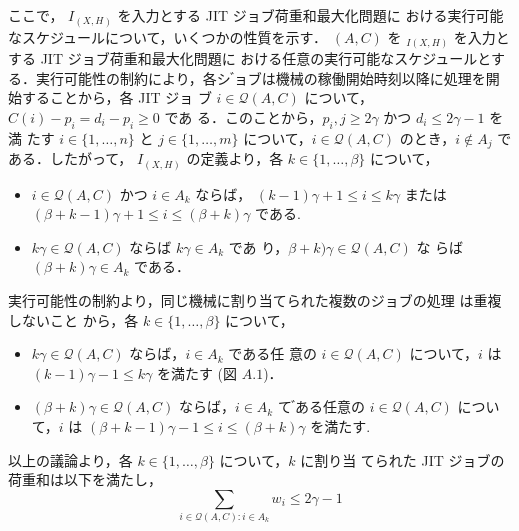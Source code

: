 \documentclass[12pt]{optlab-bachelor}
\begin{document}
ここで， $I_{(X,H)}$ を入力とする JIT ジョブ荷重和最大化問題に
おける実行可能なスケジュールについて，いくつかの性質を示す．
$(A, C)$ を $_{I(X,H)}$ を入力とする JIT ジョブ荷重和最大化問題に
おける任意の実行可能なスケジュールとする．実行可能性の制約により，各シ
゙ョブは機械の稼働開始時刻以降に処理を開始することから，各 JIT ジョ
ブ $i \in \mathcal{Q}(A,C)$ について，$C(i) − p_i = d_i − p_i \ge 0$ であ
る．このことから，$p_i,j \ge 2\gamma$ かつ $d_i \le 2\gamma − 1$ を満
たす $i \in \{1,\ldots,n\}$ と $j \in \{1,\ldots,m\}$ について，$i \in
\mathcal{Q}(A,C)$ のとき，$i \notin A_j$ である．したがって，
$I_{(X,H)}$ の定義より，各 $k \in \{1,\ldots,\beta\}$ について，
\begin{itemize}
\item $i \in \mathcal{Q}(A,C)$ かつ $i \in A_k$ ならば，
  $(k − 1)\gamma + 1 \le i \le k\gamma$ または $(\beta + k − 1)\gamma +
  1 \le i \le (\beta + k)\gamma$ である.
\item $k\gamma \in \mathcal{Q}(A,C)$ ならば $k\gamma \in A_k$ であ
  り，$\beta + k)\gamma \in \mathcal{Q}(A,C)$ な
  らば $(\beta + k)\gamma \in A_k$ である．
\end{itemize}
実行可能性の制約より，同じ機械に割り当てられた複数のジョブの処理
は重複しないこと から，各 $k \in \{1,\ldots,\beta\}$ について，
\begin{itemize}
\item $k\gamma \in \mathcal{Q}(A,C)$ ならば，$i \in A_k$ である任
  意の $i \in \mathcal{Q}(A,C)$ について，$i$ は $(k − 1)\gamma− 1
  \le k\gamma$ を満たす (図 $A.1$)．
\item $(\beta + k)\gamma \in \mathcal{Q}(A,C)$ ならば，$i \in A_k$ て
  ゙ある任意の $i \in \mathcal{Q}(A,C)$ について，$i$ は
  $(\beta + k − 1)\gamma − 1 \le i \le (\beta + k)\gamma$ を満たす.
\end{itemize}
以上の議論より，各 $k \in \{1,\ldots, \beta \}$ について，$k$ に割り当
てられた JIT ジョブの荷重和は以下を満たし，
$$\sum_{i \in \mathcal{Q}(A,C):i \in A_k}w_i \le
2\gamma - 1 \label{A.1}$$
\end{document}
